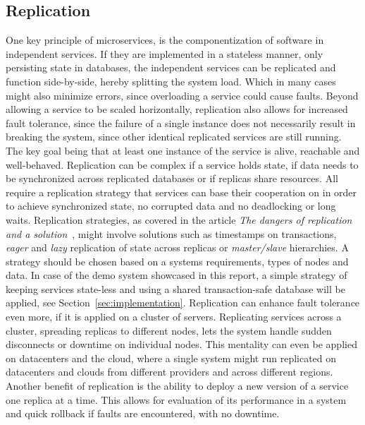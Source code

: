 \subsection{Replication}
One key principle of microservices, is the componentization of software in
independent services. If they are implemented in a stateless manner, only
persisting state in databases, the independent services can be replicated and
function side-by-side, hereby splitting the system load. Which in many cases
might also minimize errors, since overloading a service could cause faults.
Beyond allowing a service to be scaled horizontally, replication also allows
for increased fault tolerance, since the failure of a single instance does not
necessarily result in breaking the system, since other identical replicated
services are still running. The key goal being that at least one instance of the
service is alive, reachable and well-behaved.
\newline\newline
Replication can be complex if a service holds state, if data needs to be
synchronized across replicated databases or if replicas share resources.
All require a replication strategy that services can base their cooperation on
in order to achieve synchronized state, no corrupted data and no deadlocking or
long waits.
Replication strategies, as covered in the article \textit{The dangers of
replication and a solution}~\cite{gray1996dangers}, might involve solutions
such as timestamps on transactions, \textit{eager} and \textit{lazy} replication
of state across replicas or \textit{master/slave} hierarchies. A strategy should
be chosen based on a systems requirements, types of nodes and data.
In case of the demo system showcased in this report, a simple strategy of
keeping services state-less and using a shared transaction-safe database will
be applied, see Section~\ref{sec:implementation}.
\newline\newline
Replication can enhance fault tolerance even more, if it is applied on a cluster
of servers. Replicating services across a cluster, spreading replicas to
different nodes, lets the system handle sudden disconnects or downtime on
individual nodes. This mentality can even be applied on datacenters and the
cloud, where a single system might run replicated on datacenters and clouds
from different providers and across different regions.
\newline\newline
Another benefit of replication is the ability to deploy a new version of a
service one replica at a time. This allows for evaluation of its performance
in a system and quick rollback if faults are encountered, with no downtime.

